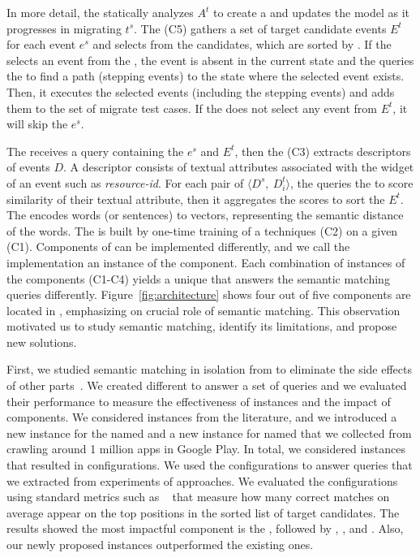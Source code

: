 \smallskip 
In more detail, the \generator statically analyzes $A^t$ to create a \tam and updates the model as it progresses in migrating $t^s$.
The \selector (C5) gathers a set of target candidate events $E^t$ for each event $e^s$ and selects from the candidates, which are sorted by \matcher.
If the \selector selects an event from the \tam, the event is absent in the current state and the \selector queries the \tam to find a path (stepping events) to the state where the selected event exists.
Then, it executes the selected events (including the stepping events) and adds them to the set of migrate test cases.
If the \selector does not select any event from $E^t$, it will skip the $e^s$.



\smallskip 
The \matcher receives a query containing the $e^s$ and $E^t$, then the \ede (C3) extracts descriptors of events $D$.
A descriptor consists of textual attributes associated with the widget of an event such as \textit{resource-id}.
For each pair of $\langle D^s,  ~D_i^t\rangle$, the \sma queries the \wem to score similarity of their textual attribute, then it aggregates the scores to sort the $E^t$.
The \wem encodes words (or sentences) to vectors, representing the semantic distance of the words.
The \wem is built by one-time training of a \we techniques (C2) on a given \corpus (C1). 
Components of \testreuse can be implemented differently, and we call the implementation an instance of the component.
Each combination of instances of the \matcher components (C1-C4) yields a unique \smconfig that answers the semantic matching queries differently.
 Figure~\ref{fig:architecture} shows four out of five \testreuse components are located in \matcher, emphasizing on crucial role of semantic matching.
 This observation motivated us to study semantic matching, identify its limitations, and propose new solutions. 

\smallskip 
 First, we studied semantic matching in isolation from \testreuse to eliminate the side effects of other \testreuse parts~\cite{mariani:SemFinder:ISSTA:2021}.
We created different \smconfigs to answer  a set of queries and we evaluated their performance to measure the effectiveness of instances and the impact of components.
We considered instances from the literature, and we introduced a new instance for the \sma named \tool and a new instance for \corpus named \gp that we collected from crawling around 1 million apps in Google Play. 
In total, we considered \ninstances instances that resulted in \ncomb configurations.
We used the configurations to answer \nquery queries that we extracted from experiments of \testreuse approaches.
We evaluated the configurations using standard metrics such as \mrr~\cite{liu:MRR:learning:2009} that measure how many correct matches  on average appear on the top positions in the sorted list of target candidates.
The results showed the most impactful component is the \sma, followed by \we, \ede, and \corpus. 
Also, our newly proposed instances outperformed the existing ones. 




